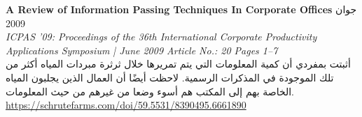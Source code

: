 \foreignlanguage{english}{\textbf{A Review of Information Passing Techniques In Corporate Offices}} \hfill جوان 2009\\
\foreignlanguage{english}{\textit{ICPAS '09: Proceedings of the 36th International Corporate Productivity Applications Symposium | June 2009 Article No.: 20 Pages 1–7}}\\
أثبتت بمفردي أن كمية المعلومات التي يتم تمريرها خلال ثرثرة مبردات المياه أكثر من تلك الموجودة في المذكرات الرسمية. لاحظت أيضًا أن العمال الذين يجلبون المياه الخاصة بهم إلى المكتب هم أسوء وضعا من غيرهم من حيث المعلومات.\\
\foreignlanguage{english}{\href{https://schrutefarms.com/doi/59.5531/8390495.6661890}{https://schrutefarms.com/doi/59.5531/8390495.6661890}}
\vspace*{2mm}